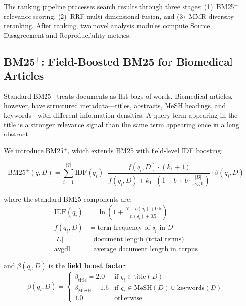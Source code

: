 \documentclass[11pt,a4paper]{article}
\begin{document}
The ranking pipeline processes search results through three stages: (1)~BM25$^{+}$ relevance scoring, (2)~RRF multi-dimensional fusion, and (3)~MMR diversity reranking.
After ranking, two novel analysis modules compute Source Disagreement and Reproducibility metrics.

\subsection{BM25$^{+}$: Field-Boosted BM25 for Biomedical Articles}
\label{sec:bm25}

Standard BM25~\citep{robertson2009bm25} treats documents as flat bags of words.
Biomedical articles, however, have structured metadata---titles, abstracts, MeSH headings, and keywords---with different information densities.
A query term appearing in the title is a stronger relevance signal than the same term appearing once in a long abstract.

We introduce BM25$^{+}$, which extends BM25 with field-level IDF boosting:

\begin{equation}
\text{BM25}^{+}(q, D) = \sum_{i=1}^{|q|} \text{IDF}(q_i) \cdot \frac{f(q_i, D) \cdot (k_1 + 1)}{f(q_i, D) + k_1 \cdot (1 - b + b \cdot \frac{|D|}{\text{avgdl}})} \cdot \beta(q_i, D)
\label{eq:bm25plus}
\end{equation}

where the standard BM25 components are:
\begin{align}
\text{IDF}(q_i) &= \ln\left(1 + \frac{N - n(q_i) + 0.5}{n(q_i) + 0.5}\right) \\
f(q_i, D) &= \text{term frequency of } q_i \text{ in } D \\
|D| &= \text{document length (total terms)} \\
\text{avgdl} &= \text{average document length in corpus}
\end{align}

and $\beta(q_i, D)$ is the \textbf{field boost factor}:
\begin{equation}
\beta(q_i, D) =
\begin{cases}
    \beta_{\text{title}} = 2.0 & \text{if } q_i \in \text{title}(D) \\
    \beta_{\text{MeSH}} = 1.5  & \text{if } q_i \in \text{MeSH}(D) \cup \text{keywords}(D) \\
    1.0                        & \text{otherwise}
\end{cases}
\label{eq:boost}
\end{equation}
\end{document}
